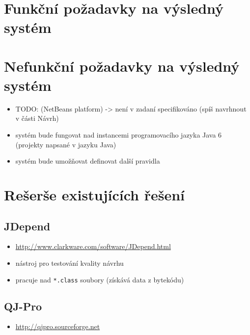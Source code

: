\section{Funkční požadavky na výsledný systém}

\section{Nefunkční požadavky na výsledný systém}
\begin{itemize}
\item TODO: (NetBeans platform) -> není v zadaní specifikováno (spíš navrhnout v části Návrh)
\item systém bude fungovat nad instancemi programovacího jazyka Java 6 (projekty napsané v jazyku Java)
\item systém bude umožňovat definovat další pravidla
\end{itemize}

\section{Rešerše existujících řešení}
\label{requirements-existing_tools}

\subsection{JDepend}

\begin{itemize}
\item \href{http://www.clarkware.com/software/JDepend.html}{http://www.clarkware.com/software/JDepend.html}
\item nástroj pro testování kvality návrhu
\item pracuje nad \verb+*.class+ soubory (získává data z bytekódu)
\end{itemize}

\subsection{QJ-Pro}
\begin{itemize}
\item \href{http://qjpro.sourceforge.net}{http://qjpro.sourceforge.net}
\end{itemize}

